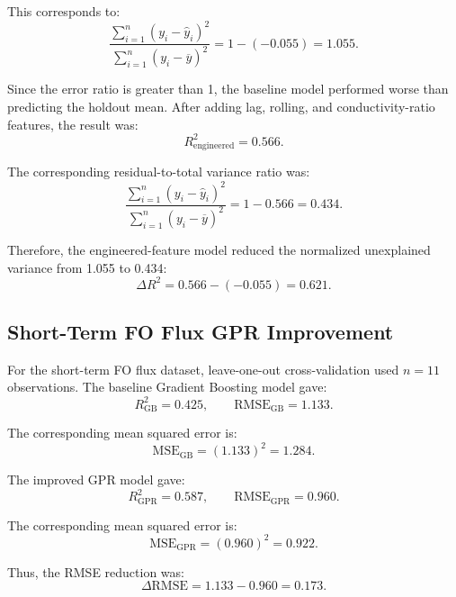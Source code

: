 This corresponds to:
\begin{equation}
\frac{\sum_{i=1}^{n}(y_i-\hat{y}_i)^2}
{\sum_{i=1}^{n}(y_i-\overline{y})^2}
=
1-(-0.055)
=
1.055.
\end{equation}

Since the error ratio is greater than 1, the baseline model performed worse than predicting the holdout mean. After adding lag, rolling, and conductivity-ratio features, the result was:
\begin{equation}
R^2_{\mathrm{engineered}} = 0.566.
\end{equation}

The corresponding residual-to-total variance ratio was:
\begin{equation}
\frac{\sum_{i=1}^{n}(y_i-\hat{y}_i)^2}
{\sum_{i=1}^{n}(y_i-\overline{y})^2}
=
1-0.566
=
0.434.
\end{equation}

Therefore, the engineered-feature model reduced the normalized unexplained variance from 1.055 to 0.434:
\begin{equation}
\Delta R^2 = 0.566 - (-0.055) = 0.621.
\end{equation}

\subsection{Short-Term FO Flux GPR Improvement}
For the short-term FO flux dataset, leave-one-out cross-validation used $n=11$ observations. The baseline Gradient Boosting model gave:
\begin{equation}
R^2_{\mathrm{GB}} = 0.425, \qquad
\mathrm{RMSE}_{\mathrm{GB}} = 1.133.
\end{equation}

The corresponding mean squared error is:
\begin{equation}
\mathrm{MSE}_{\mathrm{GB}} =
(1.133)^2
=
1.284.
\end{equation}

The improved GPR model gave:
\begin{equation}
R^2_{\mathrm{GPR}} = 0.587, \qquad
\mathrm{RMSE}_{\mathrm{GPR}} = 0.960.
\end{equation}

The corresponding mean squared error is:
\begin{equation}
\mathrm{MSE}_{\mathrm{GPR}} =
(0.960)^2
=
0.922.
\end{equation}

Thus, the RMSE reduction was:
\begin{equation}
\Delta \mathrm{RMSE}
=
1.133 - 0.960
=
0.173.
\end{equation}

